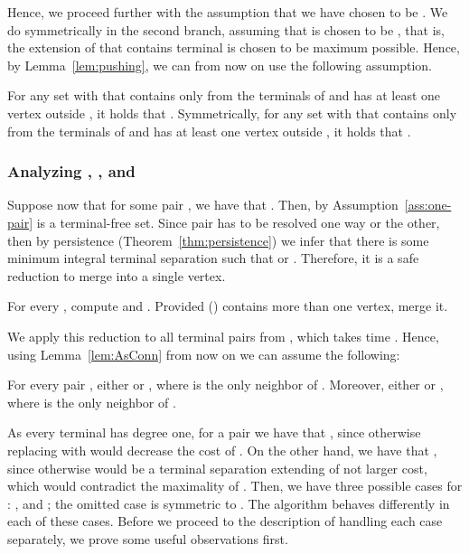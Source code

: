 Hence, we proceed further with the assumption that we have chosen  to be . We do symmetrically in the second branch, assuming that  is chosen to be , that is, the extension of  that contains terminal  is chosen to be maximum possible. Hence, by Lemma~\ref{lem:pushing}, we can from now on use the following assumption.

\begin{assumption}\label{ass:pushing}
For any set  with  that contains only  from the terminals of  and has at least one vertex outside , it holds that . Symmetrically, for any set  with  that contains only  from the terminals of  and has at least one vertex outside , it holds that . 
\end{assumption}

\subsubsection{Analyzing , , and }

Suppose now that for some pair , we have that . Then, by Assumption~\ref{ass:one-pair}  is a terminal-free set. Since pair  has to be resolved one way or the other, then by persistence (Theorem~\ref{thm:persistence}) we infer that there is some minimum integral terminal separation  such that  or . Therefore, it is a safe reduction to merge  into a single vertex.

\begin{reductionstep}
For every , compute  and . Provided  () contains more than one vertex, merge it.
\end{reductionstep}

We apply this reduction to all terminal pairs from , which takes time . Hence, using Lemma~\ref{lem:AsConn} from now on we can assume the following:

\begin{assumption}\label{ass:small-intersections}
For every pair , either  or , where  is the only neighbor of . Moreover, either  or , where  is the only neighbor of .
\end{assumption}

As every terminal has degree one, for a pair  we have that , since otherwise replacing  with  would decrease the cost of . On the other hand, we have that , since otherwise  would be a terminal separation extending  of not larger cost, which would contradict the maximality of . Then, we have three possible cases for : ,  and ; the omitted case  is symmetric to . The algorithm behaves differently in each of these cases. Before we proceed to the description of handling each case separately, we prove some useful observations first.

